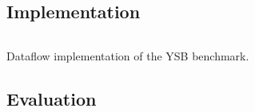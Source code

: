 \subsection{Implementation}

\begin{listing}[H]
  \inputminted[firstline=150,lastline=164,fontsize=\small]{rust}{benchmarks/src/ysb.rs}
  \caption{Dataflow implementation of the YSB benchmark.}
  \label{lst:ysb}
\end{listing}

\subsection{Evaluation}


